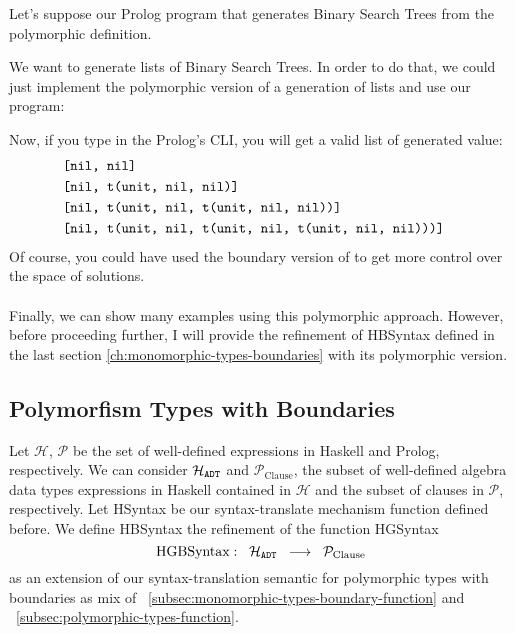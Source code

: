 	Let's suppose our Prolog program that generates Binary Search Trees from the polymorphic definition.
	
	We want to generate lists of Binary Search Trees. In order to do that, we could just implement the polymorphic version of a generation of lists and use our  program:
	
	Now, if you type  in the Prolog's CLI, you will get a valid list of  generated value:
	\begin{align*}
		  & \texttt{[nil, nil]}                                           &   \\
		  & \texttt{[nil, t(unit, nil, nil)]}                             &   \\
		  & \texttt{[nil, t(unit, nil, t(unit, nil, nil))]}               &   \\
		  & \texttt{[nil, t(unit, nil, t(unit, nil, t(unit, nil, nil)))]} &   \\
	\end{align*}
	Of course, you could have used the boundary version of  to get more control over the space of solutions.\\\\
	Finally, we can show many examples using this polymorphic approach. However, before proceeding further, I will provide the refinement of HBSyntax defined in the last section \ref{ch:monomorphic-types-boundaries} with its polymorphic version.
	\subsection{Polymorfism Types with Boundaries}
	Let $\mathcal{H}$, $\mathcal{P}$ be the set of well-defined expressions in Haskell and Prolog, respectively. We can consider $\mathcal{H}_{\texttt{ADT}}$ and $\mathcal{P}_{\text{Clause}}$, the subset of well-defined algebra data types expressions in Haskell contained in $\mathcal{H}$ and the subset of clauses in $\mathcal{P}$, respectively. Let HSyntax be our syntax-translate mechanism function defined before. We define HBSyntax the refinement of the function HGSyntax $$\text{HGBSyntax} :\;\; \mathcal{H}_{\texttt{ADT}} \;\; \longrightarrow \;\; \mathcal{P}_{\text{Clause}}$$ as an extension of our syntax-translation semantic for polymorphic types with boundaries as mix of ~\ref{subsec:monomorphic-types-boundary-function} and ~\ref{subsec:polymorphic-types-function}.\\\
